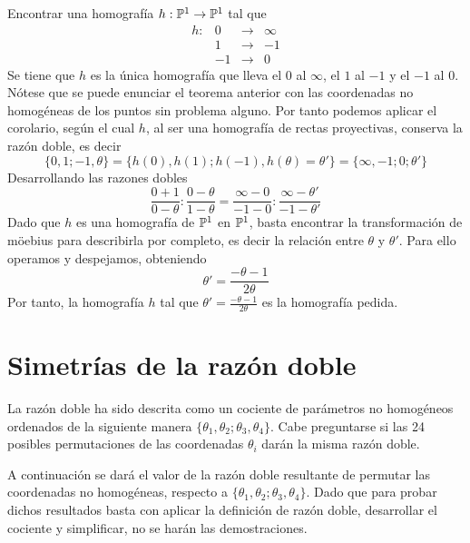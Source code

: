 \begin{exa}
	Encontrar una homografía $h:\mathbb{P}^1\rightarrow \mathbb{P}^1$ tal que 
	\begin{equation*}
		\begin{array}{cccc}
		h:&0&\rightarrow &\infty\\
		&1&\rightarrow &-1\\
		&-1&\rightarrow &0
		\end{array}
	\end{equation*}
	Se tiene que $h$ es la única homografía que lleva el $0$ al $\infty$, el $1$ al $-1$ y el $-1$ al $0$. Nótese que se puede enunciar el teorema anterior con las coordenadas no homogéneas de los puntos sin problema alguno. Por tanto podemos aplicar el corolario, según el cual $h$, al ser una homografía de rectas proyectivas, conserva la razón doble, es decir
	\begin{equation*}
		\{0,1;-1,\theta\}=\{h(0),h(1);h(-1),h(\theta)=\theta'\}=\{\infty,-1;0;\theta'\}
	\end{equation*}
	Desarrollando las razones dobles
	\begin{equation*}
		\frac{0+1}{0-\theta}:\frac{0-\theta}{1-\theta}=\frac{\infty-0}{-1-0}:\frac{\infty-\theta'}{-1-\theta'}
	\end{equation*}
	Dado que $h$ es una homografía de $\mathbb{P}^1$ en $\mathbb{P}^1$, basta encontrar la transformación de möebius para describirla por completo, es decir la relación entre $\theta$ y $\theta'$. Para ello operamos y despejamos, obteniendo
	\begin{equation*}
		\theta'=\frac{-\theta-1}{2\theta}
	\end{equation*}
	Por tanto, la homografía $h$ tal que $\theta'=\frac{-\theta-1}{2\theta}$ es la homografía pedida.
\end{exa}

\section{Simetrías de la razón doble}

La razón doble ha sido descrita como un cociente de parámetros no homogéneos ordenados de la siguiente manera $\{\theta_1,\theta_2;\theta_3,\theta_4\}$. Cabe preguntarse si las 24 posibles permutaciones de las coordenadas $\theta_i$ darán la misma razón doble.

A continuación se dará el valor de la razón doble resultante de permutar las coordenadas no homogéneas, respecto a $\{\theta_1,\theta_2;\theta_3,\theta_4\}$. Dado que para probar dichos resultados basta con aplicar la definición de razón doble, desarrollar el cociente y simplificar, no se harán las demostraciones. 

